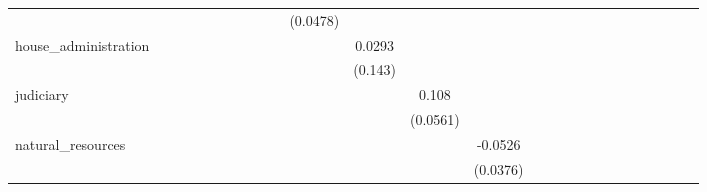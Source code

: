 \begin{tabular}{l*{25}{c}}
                    &            &            &            &            &            &            &            &            &            &    (0.0478)&            &            &            &            &            &            &            &            &            &            &            &            &            &            &            \\
house\_administration&            &            &            &            &            &            &            &            &            &            &      0.0293&            &            &            &            &            &            &            &            &            &            &            &            &            &            \\
                    &            &            &            &            &            &            &            &            &            &            &     (0.143)&            &            &            &            &            &            &            &            &            &            &            &            &            &            \\
judiciary           &            &            &            &            &            &            &            &            &            &            &            &       0.108&            &            &            &            &            &            &            &            &            &            &            &            &            \\
                    &            &            &            &            &            &            &            &            &            &            &            &    (0.0561)&            &            &            &            &            &            &            &            &            &            &            &            &            \\
natural\_resources   &            &            &            &            &            &            &            &            &            &            &            &            &     -0.0526&            &            &            &            &            &            &            &            &            &            &            &            \\
                    &            &            &            &            &            &            &            &            &            &            &            &            &    (0.0376)&            &            &            &            &            &            &            &            &            &            &            &            \\

\end{tabular}
